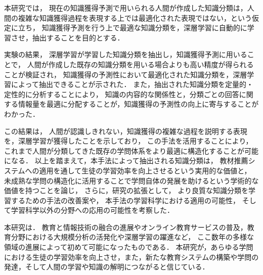 本研究では，
現在の知識獲得予測で用いられる人間が作成した知識分類は，人間の複雑な知識獲得過程を表現する上では最適化された表現ではない，という仮定に立ち，
知識獲得予測を行う上で最適な知識分類を，深層学習に自動的に学習させ，抽出することを目的とする．

実験の結果，
深層学習が学習した知識分類を抽出し，知識獲得予測に用いることで，
人間が作成した既存の知識分類を用いる場合よりも高い精度が得られることが検証され，
知識獲得の予測性において最適化された知識分類を，深層学習によって抽出できることが示された．
また，抽出された知識分類を定量的・定性的に分析することにより，
知識の内容的な関係性と，分類ごとの回答に関する情報量を最適に分配することが，知識獲得の予測性の向上に寄与することがわかった．

この結果は，
人間が認識しきれない，知識獲得の複雑な過程を説明する表現を，深層学習が獲得したことを示しており，
この手法を活用することにより，これまで人間が分類してきた既存の学問体系をより最適に構造化することが可能になる．
以上を踏まえて，本手法によって抽出される知識分類は，
教材推薦システムへの適用を通して生徒の学習効率を向上させるという実用的な価値と，
未成熟な学問の構造化に活用することで学問自体の発展を助けるという学術的な価値を持つことを論じ，
さらに，研究の拡張として，
より良質な知識分類を学習するための手法の改善案や，
本手法の学習科学における適用の可能性，
そして学習科学以外の分野への応用の可能性を考察した．


本研究は．
教育と情報技術の融合の進展やオンライン教育サービスの普及，教育分野における大規模分析の活発化や深層学習の躍進など，
ここ数年の多様な領域の進展によって初めて可能になったものである．
本研究が，あらゆる学問における生徒の学習効率を向上させ，また，新たな教育システムの構築や学問の発達，そして人間の学習や知識の解明につながると信じている．
